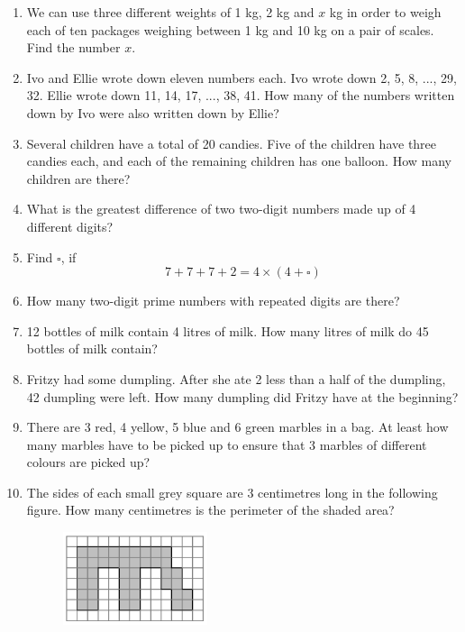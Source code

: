 \documentclass[11pt]{scrartcl}
\begin{document}
\begin{enumerate}
\item We can use three different weights of 1 kg, 2 kg and $x$ kg in order to weigh each of ten packages weighing between 1 kg and 10 kg on a pair of scales. Find the number $x$.

\item Ivo and Ellie wrote down eleven numbers each. Ivo wrote down 2, 5, 8, ..., 29, 32. Ellie wrote down 11, 14, 17, ..., 38, 41.
    How many of the numbers written down by Ivo were also written down by Ellie?

\item Several children have a total of 20 candies. Five of the children have three candies each, and each of the remaining children has one balloon. How many children are there?

\item What is the greatest difference of two two-digit numbers made up of 4 different digits?

\item Find $\square$, if
    \[ 7+7+7+2 = 4 \times (4 + \square) \]

\item How many two-digit prime numbers with repeated digits are there?

    \item  12 bottles of milk contain 4 litres of milk. How many litres of milk do 45 bottles of milk contain?

    \item  Fritzy had some dumpling. After she ate 2 less than a half of the dumpling, 42 dumpling were left. How many dumpling did Fritzy have at the beginning?

    \item  There are 3 red, 4 yellow, 5 blue and 6 green marbles in a bag. At least how many marbles have to be picked up to ensure that 3 marbles of different colours are picked up?

    
    \item  The sides of each small grey square are 3 centimetres long in the following figure. How many centimetres is the perimeter of the shaded area?
    \begin{figure}[h]
        \centering
        \includegraphics[width=0.4\textwidth]{StarGen/0Figure/perimeter-weird.png}
    \end{figure}
\end{enumerate}
\end{document}
